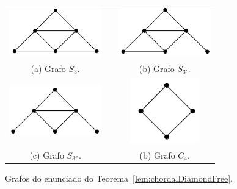 
\begin{figure}[h]
  \centering
  \begin{tabular}{  c p{0.7cm} c }
    \centering
    \includegraphics[width=4cm]{img/s3.png} & &
    \includegraphics[width=4cm]{img/s3-1.png}
    \\
    \footnotesize \centering 
    (a)  \footnotesize Grafo $S_3$. &&  \footnotesize (b) Grafo $S_{3'}$. \\
    
      \centering 
      \includegraphics[width=4cm]{img/s3-2.png} & &
    \includegraphics[width=3cm]{img/c4.png}
    \\
    \footnotesize \centering 
    (c)  \footnotesize Grafo $S_{3''}$. && \footnotesize (b) Grafo $C_{4}$.\\
  \end{tabular}

 \caption{Grafos do enunciado do  Teorema~\ref{lem:chordalDiamondFree}.}
 \label{fig:proibidos}
\end{figure} 

